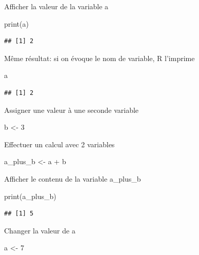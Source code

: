 \documentclass[
]{book}
\newenvironment{Shaded}{\begin{snugshade}}{\end{snugshade}}
\newcommand{\DecValTok}[1]{\textcolor[rgb]{0.00,0.00,0.81}{#1}}
\newcommand{\FunctionTok}[1]{\textcolor[rgb]{0.00,0.00,0.00}{#1}}
\newcommand{\NormalTok}[1]{#1}
\newcommand{\OtherTok}[1]{\textcolor[rgb]{0.56,0.35,0.01}{#1}}
\newcommand{\SpecialCharTok}[1]{\textcolor[rgb]{0.00,0.00,0.00}{#1}}
\begin{document}
Afficher la valeur de la variable a

\begin{Shaded}
\begin{Highlighting}[]
\FunctionTok{print}\NormalTok{(a)}
\end{Highlighting}
\end{Shaded}

\begin{verbatim}
## [1] 2
\end{verbatim}

Même résultat: si on évoque le nom de variable, R l'imprime

\begin{Shaded}
\begin{Highlighting}[]
\NormalTok{a}
\end{Highlighting}
\end{Shaded}

\begin{verbatim}
## [1] 2
\end{verbatim}

Assigner une valeur à une seconde variable

\begin{Shaded}
\begin{Highlighting}[]
\NormalTok{b }\OtherTok{\textless{}{-}} \DecValTok{3}
\end{Highlighting}
\end{Shaded}

Effectuer un calcul avec 2 variables

\begin{Shaded}
\begin{Highlighting}[]
\NormalTok{a\_plus\_b }\OtherTok{\textless{}{-}}\NormalTok{ a }\SpecialCharTok{+}\NormalTok{ b}
\end{Highlighting}
\end{Shaded}

Afficher le contenu de la variable a\_plus\_b

\begin{Shaded}
\begin{Highlighting}[]
\FunctionTok{print}\NormalTok{(a\_plus\_b)}
\end{Highlighting}
\end{Shaded}

\begin{verbatim}
## [1] 5
\end{verbatim}

Changer la valeur de a

\begin{Shaded}
\begin{Highlighting}[]
\NormalTok{a }\OtherTok{\textless{}{-}} \DecValTok{7} 
\end{Highlighting}
\end{Shaded}
\end{document}
